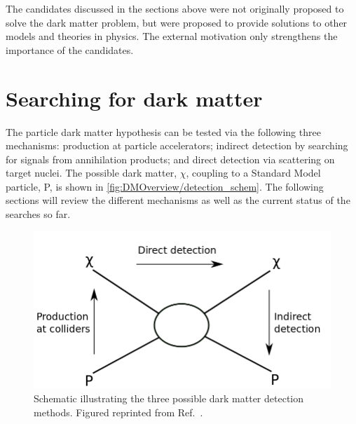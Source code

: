 \begin{flushleft}
The candidates discussed in the sections above were not originally proposed to solve the dark matter problem, but were proposed to provide solutions to other models and theories in physics. The external motivation only strengthens the importance of the candidates.
\end{flushleft}

\newpage

\section{Searching for dark matter}\label{sec:DMOverview/DetectionOfDM}
The particle dark matter hypothesis can be tested via the following three mechanisms: production at particle accelerators; indirect detection by searching for signals from annihilation products; and direct detection via scattering on target nuclei. The possible dark matter, $\chi$, coupling to a Standard Model particle, P, is shown in \autoref{fig:DMOverview/detection_schem}. The following sections will review the different mechanisms as well as the current status of the searches so far. 
\begin{figure}[h!]
	\centering
	\includegraphics[width=0.7\linewidth]{figures/DMOverview/Detection_schematic.png}
	\caption[Schematic illustrating the possible dark matter detection methods.]{Schematic illustrating the three possible dark matter detection methods. Figured reprinted from Ref.~\cite{DirectDetection2015}.}
	\label{fig:DMOverview/detection_schem}
\end{figure}

